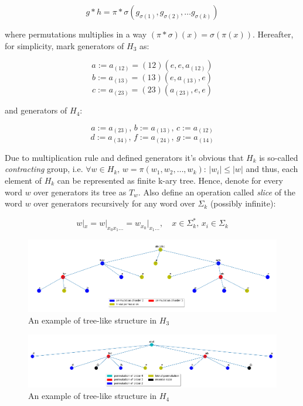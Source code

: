 \documentclass[a4paper,12pt]{amsart}
\begin{document}
$$g*h = \pi * \sigma (g_{\sigma(1)}, g_{\sigma(2)}, \dots g_{\sigma(k)})$$

where permutations multiplies in a way $(\pi * \sigma)(x) = \sigma(\pi(x))$.
Hereafter, for simplicity, mark generators of $H_3$ as: 

$$ a := a_{(12)} = (1 2) (e, e, a_{(12)}) $$
$$ b := a_{(13)} = (1 3) (e, a_{(13)}, e) $$
$$ c := a_{(23)} = (2 3) (a_{(23)}, e, e) $$

and generators of $H_4$: 



$$ a := a_{(23)}, \, b := a_{(13)}, \, c := a_{(12)} $$
$$ d := a_{(34)}, \, f := a_{(24)}, \, g := a_{(14)} $$


Due to multiplication rule and defined generators it's obvious that $H_k$ is so-called \textit{contracting} group, i.e. $\forall w \in H_k, \, w = \pi (w_1, w_2, \dots, w_k) :\, |w_i| \le |w|$ and thus, each element of $H_k$ can be represented as finite k-ary tree. Hence, denote for every word $w$ over generators its tree as $T_w$.
Also define an operation called \textit{slice} of the word $w$ over generators recursively for any word over $\Sigma_k$ (possibly infinite): 

$$w|_x = w|_{x_0x_1\dots} = w_{x_0}|_{x_1\dots}, \quad x \in \Sigma_k^*, \, x_i \in \Sigma_k$$

\begin{figure}[h]
	\includegraphics[scale=0.43]{abcabc.png}
	\caption{An example of tree-like structure in $H_3$}
\end{figure}

\begin{figure}[h]
	\includegraphics[scale=0.5]{abd.png}
	\caption{An example of tree-like structure in $H_4$}
\end{figure}
\end{document}
